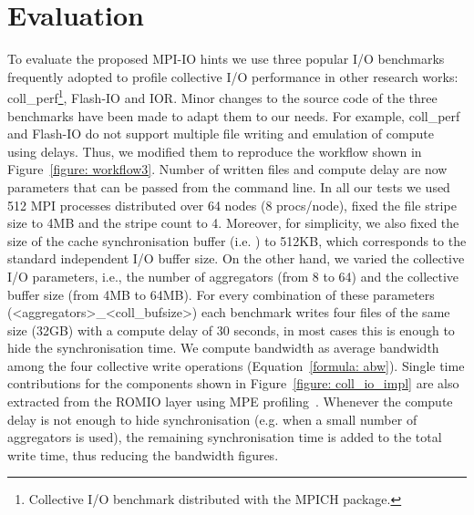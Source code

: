 \section{Evaluation}
\label{sec: results}
To evaluate the proposed MPI-IO hints we use three popular I/O benchmarks frequently adopted to profile collective I/O performance in other research works: coll\_perf\footnote{Collective I/O benchmark distributed with the MPICH package.}, Flash-IO and IOR.
Minor changes to the source code of the three benchmarks have been made to adapt them to our needs. For example, coll\_perf and Flash-IO do not support multiple file writing and emulation of compute using delays. Thus, we modified them to reproduce the workflow shown in Figure~\ref{figure: workflow3}. Number of written files and compute delay are now parameters that can be passed from the command line.
In all our tests we used 512 MPI processes distributed over 64 nodes (8 procs/node), fixed the file stripe size to 4MB and the stripe count to 4. Moreover, for simplicity, we also fixed the size of the cache synchronisation buffer (i.e. ) to 512KB, which corresponds to the standard independent I/O buffer size. On the other hand, we varied the collective I/O parameters, i.e., the number of aggregators (from 8 to 64) and the collective buffer size (from 4MB to 64MB). For every combination of these parameters (<aggregators>\_<coll\_bufsize>) each benchmark writes four files of the same size (32GB) with a compute delay of 30 seconds, in most cases this is enough to hide the synchronisation time. We compute bandwidth as average bandwidth among the four collective write operations (Equation~\ref{formula: abw}). Single time contributions for the components shown in Figure~\ref{figure: coll_io_impl} are also extracted from the ROMIO layer using MPE profiling~\cite{mpe}.
Whenever the compute delay is not enough to hide synchronisation (e.g. when a small number of aggregators is used), the remaining synchronisation time is added to the total write time, thus reducing the bandwidth figures.

